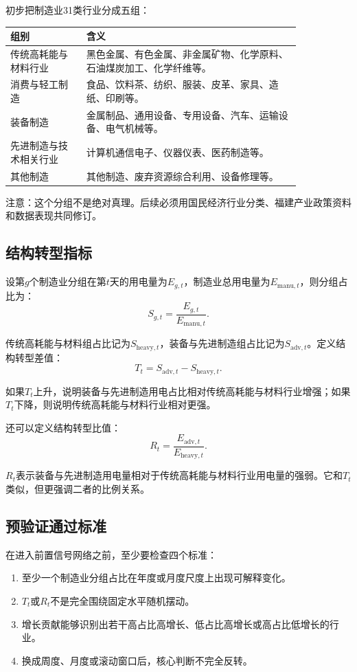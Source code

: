 \documentclass[UTF8,a4paper,11pt]{ctexart}
\newcommand{\manu}{\mathrm{manu}}
\newcommand{\heavy}{\mathrm{heavy}}
\newcommand{\adv}{\mathrm{adv}}
\begin{document}
初步把制造业31类行业分成五组：

\begin{longtable}{p{0.22\linewidth}p{0.62\linewidth}}
\toprule
组别 & 含义 \\
\midrule
传统高耗能与材料行业 & 黑色金属、有色金属、非金属矿物、化学原料、石油煤炭加工、化学纤维等。\\
消费与轻工制造 & 食品、饮料茶、纺织、服装、皮革、家具、造纸、印刷等。\\
装备制造 & 金属制品、通用设备、专用设备、汽车、运输设备、电气机械等。\\
先进制造与技术相关行业 & 计算机通信电子、仪器仪表、医药制造等。\\
其他制造 & 其他制造、废弃资源综合利用、设备修理等。\\
\bottomrule
\end{longtable}

注意：这个分组不是绝对真理。后续必须用国民经济行业分类、福建产业政策资料和数据表现共同修订。

\subsection{结构转型指标}

设第$g$个制造业分组在第$t$天的用电量为$E_{g,t}$，制造业总用电量为$E_{\manu,t}$，则分组占比为：
\[
S_{g,t}
=
\frac{E_{g,t}}{E_{\manu,t}}.
\]

传统高耗能与材料组占比记为$S_{\heavy,t}$，装备与先进制造组占比记为$S_{\adv,t}$。定义结构转型差值：
\[
T_t
=
S_{\adv,t}
-
S_{\heavy,t}.
\]

如果$T_t$上升，说明装备与先进制造用电占比相对传统高耗能与材料行业增强；如果$T_t$下降，则说明传统高耗能与材料行业相对更强。

还可以定义结构转型比值：
\[
R_t
=
\frac{E_{\adv,t}}{E_{\heavy,t}}.
\]

$R_t$表示装备与先进制造用电量相对于传统高耗能与材料行业用电量的强弱。它和$T_t$类似，但更强调二者的比例关系。

\subsection{预验证通过标准}

在进入前置信号网络之前，至少要检查四个标准：

\begin{enumerate}
  \item 至少一个制造业分组占比在年度或月度尺度上出现可解释变化。
  \item $T_t$或$R_t$不是完全围绕固定水平随机摆动。
  \item 增长贡献能够识别出若干高占比高增长、低占比高增长或高占比低增长的行业。
  \item 换成周度、月度或滚动窗口后，核心判断不完全反转。
\end{enumerate}
\end{document}
